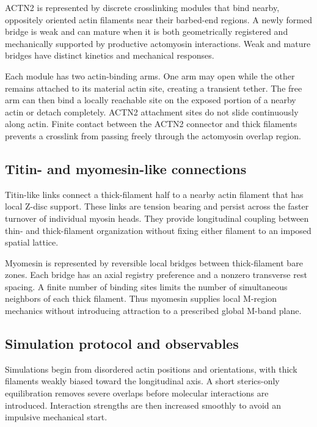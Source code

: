 \documentclass[11pt]{article}
\begin{document}
ACTN2 is represented by discrete crosslinking modules that bind nearby,
oppositely oriented actin filaments near their barbed-end regions. A newly
formed bridge is weak and can mature when it is both geometrically registered
and mechanically supported by productive actomyosin interactions. Weak and
mature bridges have distinct kinetics and mechanical responses.

Each module has two actin-binding arms. One arm may open while the other
remains attached to its material actin site, creating a transient tether. The
free arm can then bind a locally reachable site on the exposed portion of a
nearby actin or detach completely. ACTN2 attachment sites do not slide
continuously along actin. Finite contact between the ACTN2 connector and thick
filaments prevents a crosslink from passing freely through the actomyosin
overlap region.


\subsection{Titin- and myomesin-like connections}

Titin-like links connect a thick-filament half to a nearby actin filament that
has local Z-disc support. These links are tension bearing and persist across
the faster turnover of individual myosin heads. They provide longitudinal
coupling between thin- and thick-filament organization without fixing either
filament to an imposed spatial lattice.

Myomesin is represented by reversible local bridges between thick-filament
bare zones. Each bridge has an axial registry preference and a nonzero
transverse rest spacing. A finite number of binding sites limits the number of
simultaneous neighbors of each thick filament. Thus myomesin supplies local
M-region mechanics without introducing attraction to a prescribed global
M-band plane.


\subsection{Simulation protocol and observables}

Simulations begin from disordered actin positions and orientations, with
thick filaments weakly biased toward the longitudinal axis. A short
sterics-only equilibration removes severe overlaps before molecular
interactions are introduced. Interaction strengths are then increased
smoothly to avoid an impulsive mechanical start.
\end{document}
